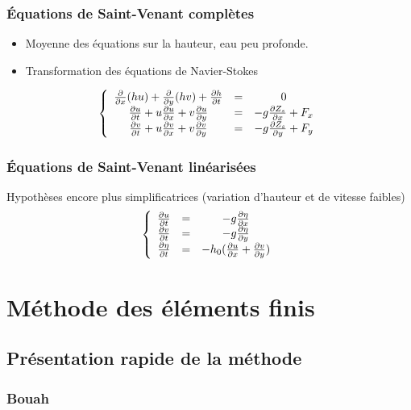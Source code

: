 \documentclass[handout]{beamer}
\begin{document}
\begin{frame}
	\frametitle{Équations de Saint-Venant complètes}
	\begin{itemize}
		\item Moyenne des équations sur la hauteur, eau peu profonde.
		\item Transformation des équations de Navier-Stokes
	\end{itemize}

	\[	\left\{ \begin{array}{c c c}
	\frac{\partial}{\partial x} (hu) + \frac{\partial}{\partial y} (hv) + \frac{\partial h}{\partial t} &=& 0 \\
      \frac{\partial u}{\partial t} + u\frac{\partial u}{\partial x} + v\frac{\partial u}{\partial y} &=& -g\frac{\partial Z_s}{\partial x} + F_x\\
	 \frac{\partial v}{\partial t} + u\frac{\partial v}{\partial x} + v\frac{\partial v}{\partial y}&=& -g\frac{\partial Z_s}{\partial y} + F_y
	\end{array}\right.	\]
\end{frame}

\begin{frame}
	\frametitle{Équations de Saint-Venant linéarisées}
	Hypothèses encore plus simplificatrices (variation d'hauteur et de vitesse faibles)
	\[	\left\{ 
	\begin{array}{c c c}
		\frac{\partial u}{\partial t}	& = & -g \frac{\partial \eta}{\partial x}\\
		\frac{\partial v}{\partial t} & = & -g  \frac{\partial \eta}{\partial y}\\
      \frac{\partial \eta}{\partial t} & = & - h_0  (\frac{\partial u}{\partial x}+\frac{\partial v}{\partial y} )\\
		
		
	\end{array}
	\right.\]
\end{frame}

\section{Méthode des éléments finis}
\subsection[Présentation]{Présentation rapide de la méthode}
\begin{frame}
	\frametitle{Bouah}

\end{frame}
\end{document}
